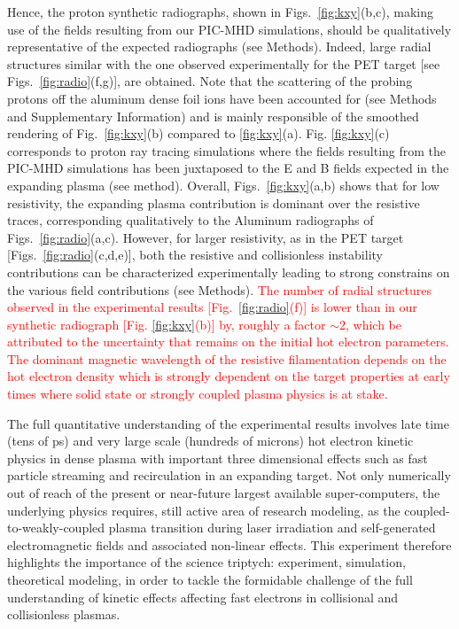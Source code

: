 \documentclass[aps,twocolumn,showpacs,superscriptaddress]{revtex4}
\begin{document}
Hence, the proton synthetic radiographs, shown in Figs.~\ref{fig:kxy}(b,c), making use of the fields resulting from our PIC-MHD simulations, should be qualitatively representative of the expected radiographs (see Methods). Indeed,  large radial structures similar with the one observed experimentally for the PET target [see Figs.~\ref{fig:radio}(f,g)],  are obtained. Note that the scattering of the probing protons off the aluminum dense foil ions have been accounted for (see Methods and Supplementary Information) and is mainly responsible of the smoothed rendering of Fig.~\ref{fig:kxy}(b) compared to \ref{fig:kxy}(a).
Fig. \ref{fig:kxy}(c) corresponds to proton ray tracing simulations where the fields resulting from the PIC-MHD simulations has been juxtaposed to the E and B fields expected in the expanding plasma (see method). 
Overall, Figs.~\ref{fig:kxy}(a,b) shows that for low resistivity, the expanding plasma contribution is dominant over the resistive traces, corresponding qualitatively to the Aluminum radiographs of Figs.~\ref{fig:radio}(a,c). However, for larger resistivity, as in the PET target [Figs.~\ref{fig:radio}(c,d,e)], both the resistive and collisionless instability  contributions can be characterized experimentally  leading to strong constrains on the various field contributions (see Methods).
\textcolor{red}{
The number of radial structures observed in the experimental results [Fig.~\ref{fig:radio}(f)] is lower than in    our synthetic radiograph [Fig. \ref{fig:kxy}(b)] by, roughly a factor $\sim 2$, which  be attributed to the uncertainty that remains on the initial hot electron parameters. The dominant magnetic wavelength of the resistive filamentation depends on the hot electron density which is   strongly dependent on the target properties at  early times where   solid state or strongly coupled plasma physics is at stake. 
 }
 
The full quantitative understanding of the experimental results involves late time (tens of ps) and very large scale (hundreds of microns) hot electron kinetic physics in dense plasma  with important three dimensional  effects such as fast particle streaming and recirculation in an expanding target.
Not only numerically out of reach of the present or near-future largest available super-computers, the  underlying physics requires, still active area of research modeling, as the coupled-to-weakly-coupled plasma transition during laser irradiation  and self-generated electromagnetic fields and associated non-linear effects.
This experiment therefore highlights the importance of the science triptych:  experiment, simulation, theoretical modeling, in order  to tackle the formidable challenge of the  full understanding of kinetic effects affecting fast electrons in collisional and collisionless plasmas.
\end{document}
